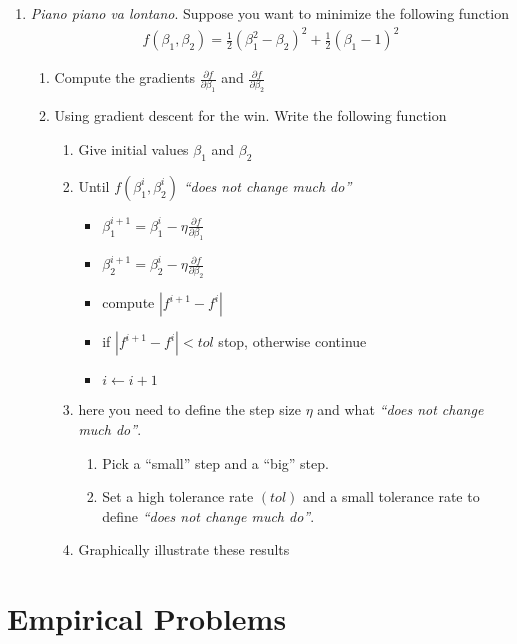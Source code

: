 \documentclass[12pt,onecolumn,A4]{article}
\begin{document}
\begin{enumerate}
  \item {\it Piano piano va lontano}. Suppose you want to minimize the following function 
  \begin{align}
  f(\beta_1,\beta_2)=\frac{1}{2}(\beta_1^2-\beta_2)^2+ \frac{1}{2}(\beta_1-1)^2
  \end{align}
  \begin{enumerate}
    \item Compute the gradients $\frac{\partial f}{\partial \beta_1}$ and $\frac{\partial f}{\partial \beta_2}$
    \item Using gradient descent for the win. Write the following function
    \begin{enumerate}
      \item Give initial values $\beta_1$ and $\beta_2$
      \item Until $f(\beta^i_1,\beta^i_2)$ {\it ``does not change much do''}
      \begin{itemize}
       \item $\beta_1^{i+1} = \beta_1^{i} - \eta \frac{\partial f}{\partial \beta_1}$
       \item $\beta_2^{i+1} = \beta_2^{i} - \eta \frac{\partial f}{\partial \beta_2}$
       \item compute $|f^{i+1}-f^{i}|$
       \item if $|f^{i+1}-f^{i}|<tol$ stop, otherwise continue
       \item $i \leftarrow i+1$
      \end{itemize}
      \item here you need to define the step size $\eta$ and what {\it ``does not change much do''}. 
      \begin{enumerate}
        \item Pick a ``small'' step and a ``big'' step. 
        \item Set a high tolerance rate $(tol)$ and a small tolerance rate to define {\it ``does not change much do''}. 
      \end{enumerate}
      \item Graphically illustrate these results
    \end{enumerate}
  \end{enumerate}
\end{enumerate}



\section{Empirical Problems}
\end{document}
